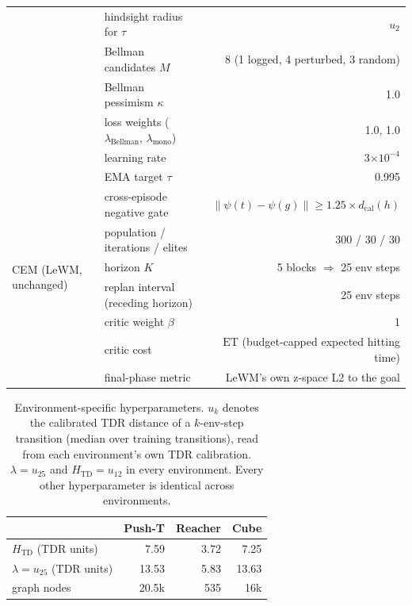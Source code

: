 \documentclass{article} %
\newcommand{\psiT}{\psi}
\newcommand{\Htd}{H_{\mathrm{TD}}}
\newcommand{\ET}{\mathrm{ET}}
\begin{document}
\begin{table}[h]
\begin{tabular}{llr}
 & hindsight radius for $\tau$ & $u_2$ \\
 & Bellman candidates $M$ & 8 (1 logged, 4 perturbed, 3 random) \\
 & Bellman pessimism $\kappa$ & 1.0 \\
 & loss weights ($\lambda_{\mathrm{Bellman}}$, $\lambda_{\mathrm{mono}}$) & 1.0, 1.0 \\
 & learning rate & 3$\times10^{-4}$ \\
 & EMA target $\tau$ & 0.995 \\
 & cross-episode negative gate & $\|\psiT(t)-\psiT(g)\|\ge 1.25\times d_{\mathrm{cal}}(h)$ \\
\midrule
\multirow{4}{*}{CEM (LeWM, unchanged)}
 & population / iterations / elites & 300 / 30 / 30 \\
 & horizon $K$ & 5 blocks $\Rightarrow$ 25 env steps \\
 & replan interval (receding horizon) & 25 env steps \\
\midrule
\multirow{3}{*}{Criterion (\cref{eq:compose})}
 & critic weight $\beta$ & 1 \\
 & critic cost & $\ET$ (budget-capped expected hitting time) \\
 & final-phase metric & LeWM's own z-space L2 to the goal \\
\bottomrule
\end{tabular}
\end{table}

\begin{table}[h]
\centering\small
\caption{Environment-specific hyperparameters. $u_k$ denotes the calibrated TDR distance of a
$k$-env-step transition (median over training transitions), read from each environment's own TDR calibration.
$\lambda=u_{25}$ and $\Htd=u_{12}$ in every environment. Every other
hyperparameter is
identical across environments.}
\label{tab:hyper-env}
\begin{tabular}{lrrr}
\toprule
& Push-T & Reacher & Cube \\
\midrule
$\Htd$ (TDR units) & 7.59 & 3.72 & 7.25 \\
$\lambda=u_{25}$ (TDR units) & 13.53 & 5.83 & 13.63 \\
graph nodes & 20.5k & 535 & 16k \\
\bottomrule
\end{tabular}
\end{table}
\end{document}
